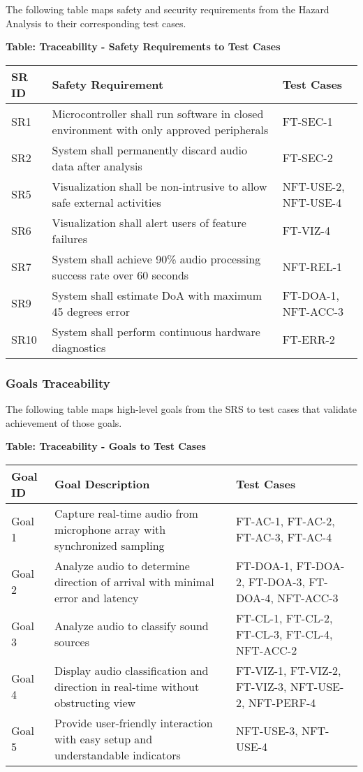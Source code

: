 \documentclass[12pt, titlepage]{article}
\begin{document}
The following table maps safety and security requirements from the Hazard
Analysis to their corresponding test cases.

\noindent
\textbf{Table: Traceability - Safety Requirements to Test Cases}

\noindent
\begin{tabular}{|p{3cm}|p{8cm}|p{3cm}|}
\hline
\textbf{SR ID} & \textbf{Safety Requirement} & \textbf{Test Cases} \\
\hline
SR1 & Microcontroller shall run software in closed environment with only approved peripherals & FT-SEC-1 \\
\hline
SR2 & System shall permanently discard audio data after analysis & FT-SEC-2 \\
\hline
SR5 & Visualization shall be non-intrusive to allow safe external activities & NFT-USE-2, NFT-USE-4 \\
\hline
SR6 & Visualization shall alert users of feature failures & FT-VIZ-4 \\
\hline
SR7 & System shall achieve 90\% audio processing success rate over 60 seconds & NFT-REL-1 \\
\hline
SR9 & System shall estimate DoA with maximum 45 degrees error & FT-DOA-1, NFT-ACC-3 \\
\hline
SR10 & System shall perform continuous hardware diagnostics & FT-ERR-2 \\
\hline
\end{tabular}

\subsubsection{Goals Traceability}

The following table maps high-level goals from the SRS to test cases that
validate achievement of those goals.

\noindent
\textbf{Table: Traceability - Goals to Test Cases}

\noindent
\begin{tabular}{|p{3cm}|p{8cm}|p{4cm}|}
\hline
\textbf{Goal ID} & \textbf{Goal Description} & \textbf{Test Cases} \\
\hline
Goal 1 & Capture real-time audio from microphone array with synchronized sampling & FT-AC-1, FT-AC-2, FT-AC-3, FT-AC-4 \\
\hline
Goal 2 & Analyze audio to determine direction of arrival with minimal error and latency & FT-DOA-1, FT-DOA-2, FT-DOA-3, FT-DOA-4, NFT-ACC-3 \\
\hline
Goal 3 & Analyze audio to classify sound sources & FT-CL-1, FT-CL-2, FT-CL-3, FT-CL-4, NFT-ACC-2 \\
\hline
Goal 4 & Display audio classification and direction in real-time without obstructing view & FT-VIZ-1, FT-VIZ-2, FT-VIZ-3, NFT-USE-2, NFT-PERF-4 \\
\hline
Goal 5 & Provide user-friendly interaction with easy setup and understandable indicators & NFT-USE-3, NFT-USE-4 \\
\hline
\end{tabular}
\end{document}
